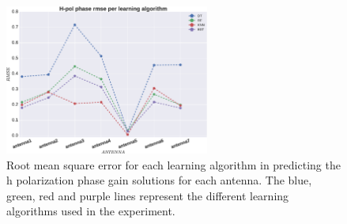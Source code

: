 \begin{figure}[H]
  \centering
    \includegraphics[width=0.6\textwidth]{images/Hpol-phase.eps}
    \caption{Root mean square error for each learning algorithm in predicting the h polarization phase gain solutions for each antenna. The blue, green, red and purple lines represent the different learning algorithms used in the experiment.}
  \label{phrm}
 \end{figure}
